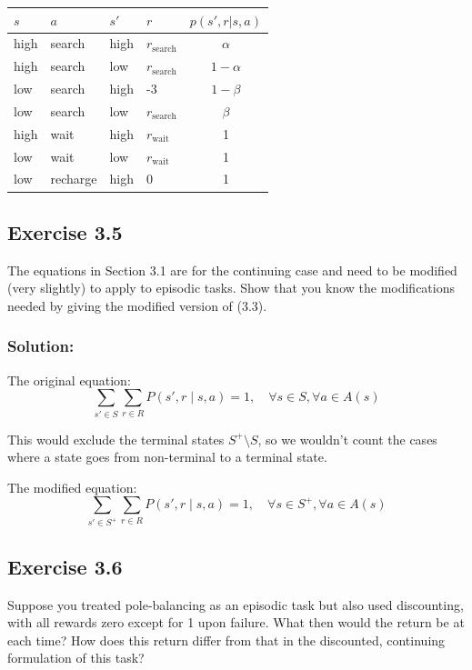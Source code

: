 \begin{table}[h!]
    \centering
    \begin{tabular}{ll|ll|c}
        $s$  & $a$      & $s'$ & $r$                 & $p(s', r |s, a)$ \\ \hline
        high & search   & high & $r_{\text{search}}$ & $\alpha$         \\
        high & search   & low  & $r_{\text{search}}$ & $1 - \alpha$     \\
        low  & search   & high & -3                  & $1 - \beta$      \\
        low  & search   & low  & $r_{\text{search}}$ & $\beta$          \\
        high & wait     & high & $r_{\text{wait}}$   & 1                \\
        low  & wait     & low  & $r_{\text{wait}}$   & 1                \\
        low  & recharge & high & 0                   & 1               
    \end{tabular}
\end{table}


\subsection*{Exercise 3.5}
The equations in Section 3.1 are for the continuing case and need to be
modified (very slightly) to apply to episodic tasks. Show that you know the modifications
needed by giving the modified version of (3.3).

\subsubsection*{Solution:}
The original equation:
\[
\sum_{s' \in S} \sum_{r \in R} P(s', r \mid s, a) = 1, \quad \forall s \in S, \forall a \in A(s)
\]

This would exclude the terminal states $S^+ \setminus S$, so we wouldn't count the cases where a state goes from non-terminal to a terminal state.

The modified equation:
\[
\sum_{s' \in S^+} \sum_{r \in R} P(s', r \mid s, a) = 1, \quad \forall s \in S^+, \forall a \in A(s)
\]


\subsection*{Exercise 3.6}
Suppose you treated pole-balancing as an episodic task but also used
discounting, with all rewards zero except for  1 upon failure. What then would the
return be at each time? How does this return differ from that in the discounted, continuing
formulation of this task?

